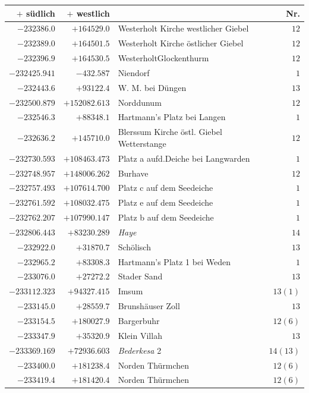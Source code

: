 \clearpage{}%
\begin{center}\begingroup\fontsize{8}{9}\selectfont
\setlength{\tabcolsep}{4pt}
\begin{tabular}{r|r|p{170pt}|r}\hline
\(+\) südlich&\(+\) westlich&&Nr.\\\hline
\(-232386.0\)&\(+164529.0\)&Westerholt Kirche westlicher Giebel&\(12\)\\
\(-232389.0\)&\(+164501.5\)&Westerholt Kirche östlicher Giebel&\(12\)\\
\(-232396.9\)&\(+164530.5\)&WesterholtGlockenthurm&\(12\)\\
\(-232425.941\)&\(-432.587\)&Niendorf&\(1\)\\
\(-232443.6\)&\(+93122.4\)&W. M. bei Düngen&\(13\)\\
\(-232500.879\)&\(+152082.613\)&Norddunum&\(12\)\\
\(-232546.3\)&\(+88348.1\)&Hartmann’s Platz bei Langen&\(1\)\\
\(-232636.2\)&\(+145710.0\)&Blerssum Kirche östl. Giebel Wetterstange&\(12\)\\
\(-232730.593\)&\(+108463.473\)&Platz a aufd.Deiche bei Langwarden&\(1\)\\
\(-232748.957\)&\(+148006.262\)&Burhave&\(12\)\\
\(-232757.493\)&\(+107614.700\)&Platz c auf dem Seedeiche&\(1\)\\
\(-232761.592\)&\(+108032.475\)&Platz e auf dem Seedeiche&\(1\)\\
\(-232762.207\)&\(+107990.147\)&Platz b auf dem Seedeiche&\(1\)\\
\(-232806.443\)&\(+83230.289\)&\textit{Haye}&\(14\)\\
\(-232922.0\)&\(+31870.7\)&Schölisch&\(13\)\\
\(-232965.2\)&\(+83308.3\)&Hartmann’s Platz 1 bei Weden&\(1\)\\
\(-233076.0\)&\(+27272.2\)&Stader Sand&\(13\)\\
\(-233112.323\)&\(+94327.415\)&Imsum&\(13(1)\)\\
\(-233145.0\)&\(+28559.7\)&Brunshäuser Zoll&\(13\)\\
\(-233154.5\)&\(+180027.9\)&Bargerbuhr&\(12(6)\)\\
\(-233347.9\)&\(+35320.9\)&Klein Villah&\(13\)\\
\(-233369.169\)&\(+72936.603\)&\textit{Bederkesa} 2&\(14(13)\)\\
\(-233400.0\)&\(+181238.4\)&Norden Thürmchen&\(12(6)\)\\
\(-233419.4\)&\(+181420.4\)&Norden Thürmchen&\(12(6)\)\\

\end{tabular}
\end{center}
